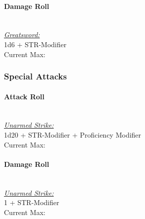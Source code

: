 {\paragraph*{Damage Roll}\hfill\\
\underline{\textit{Greatsword:}}\\
1d6 + STR-Modifier\\
\indent Current Max: 
\subsubsection*{Special Attacks}
\paragraph*{Attack Roll}\hfill\\
\underline{\textit{Unarmed Strike:}}\\
1d20 + STR-Modifier + Proficiency Modifier\\
\indent Current Max: 
\paragraph*{Damage Roll}\hfill\\
\underline{\textit{Unarmed Strike:}}\\
1 + STR-Modifier\\
\indent Current Max: 
}